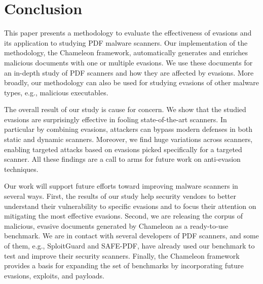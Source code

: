 \section{Conclusion}
\label{ss: conclusion}

This paper presents a methodology to evaluate the effectiveness of evasions and its application to studying PDF malware scanners.
Our implementation of the methodology, the Chameleon framework, automatically generates and enriches malicious documents with one or multiple evasions.
We use these documents for an in-depth study of \nbAnalyzers{} PDF scanners and how they are affected by evasions.
More broadly, our methodology can also be used for studying evasions of other malware types, e.g., malicious executables.

The overall result of our study is cause for concern.
We show that the studied evasions are surprisingly effective in fooling state-of-the-art scanners.
In particular by combining evasions, attackers can bypass modern defenses in both static and dynamic scanners.
Moreover, we find huge variations across scanners, enabling targeted attacks based on evasions picked specifically for a targeted scanner.
All these findings are a call to arms for future work on anti-evasion techniques.

Our work will support future efforts toward improving malware scanners in several ways.
First, the results of our study help security vendors to better understand their vulnerability to specific evasions and to focus their attention on mitigating the most effective evasions.
Second, we are releasing the corpus of malicious, evasive documents generated by Chameleon as a ready-to-use benchmark.
We are in contact with several developers of PDF scanners, and some of them, e.g., SploitGuard and SAFE-PDF, have already used our benchmark to test and improve their security scanners.
Finally, the Chameleon framework provides a basis for expanding the set of benchmarks by incorporating future evasions, exploits, and payloads.

